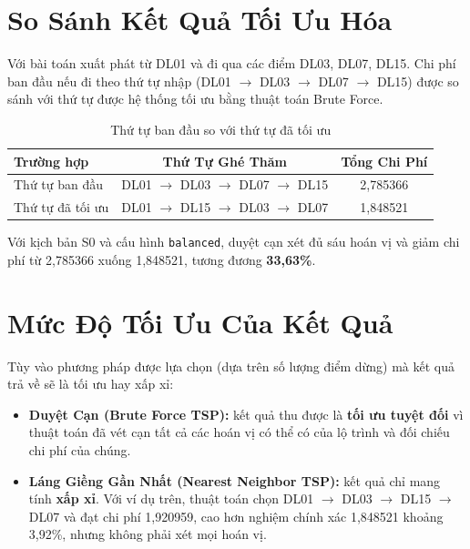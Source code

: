 \section{So Sánh Kết Quả Tối Ưu Hóa}

Với bài toán xuất phát từ DL01 và đi qua các điểm DL03, DL07, DL15. Chi phí ban đầu nếu đi theo thứ tự nhập (DL01 $\rightarrow$ DL03 $\rightarrow$ DL07 $\rightarrow$ DL15) được so sánh với thứ tự được hệ thống tối ưu bằng thuật toán Brute Force.

\begin{table}[h!]
\centering
\caption{Thứ tự ban đầu so với thứ tự đã tối ưu}
\label{tab:multilocation_opt}
\begin{tabular}{lcc}
\toprule
Trường hợp & Thứ Tự Ghé Thăm & Tổng Chi Phí \\
\midrule
Thứ tự ban đầu & DL01 $\rightarrow$ DL03 $\rightarrow$ DL07 $\rightarrow$ DL15 & 2,785366 \\
Thứ tự đã tối ưu & DL01 $\rightarrow$ DL15 $\rightarrow$ DL03 $\rightarrow$ DL07 & 1,848521 \\
\bottomrule
\end{tabular}
\end{table}

Với kịch bản S0 và cấu hình \texttt{balanced}, duyệt cạn xét đủ sáu hoán vị
và giảm chi phí từ 2,785366 xuống 1,848521, tương đương \textbf{33,63\%}.

\section{Mức Độ Tối Ưu Của Kết Quả}

Tùy vào phương pháp được lựa chọn (dựa trên số lượng điểm dừng) mà kết quả trả về sẽ là tối ưu hay xấp xỉ:

\begin{itemize}[itemsep=2pt]
  \item \textbf{Duyệt Cạn (Brute Force TSP):} kết quả thu được là \textbf{tối ưu tuyệt đối} vì thuật toán đã vét cạn tất cả các hoán vị có thể có của lộ trình và đối chiếu chi phí của chúng.
  \item \textbf{Láng Giềng Gần Nhất (Nearest Neighbor TSP):} kết quả chỉ mang
  tính \textbf{xấp xỉ}. Với ví dụ trên, thuật toán chọn DL01 $\rightarrow$
  DL03 $\rightarrow$ DL15 $\rightarrow$ DL07 và đạt chi phí 1,920959, cao hơn
  nghiệm chính xác 1,848521 khoảng 3,92\%, nhưng không phải xét mọi hoán vị.
\end{itemize}
